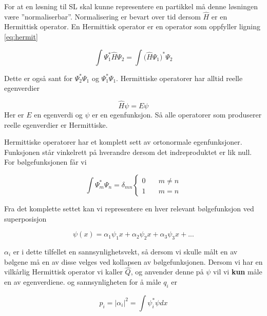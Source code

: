 For at en løsning til SL skal kunne representere en partikkel må denne løsningen være ''normaliserbar''. Normalisering er bevart over tid dersom $\hat{H}$ er en Hermittisk operator. En Hermittisk operator er en operator som oppfyller ligning \ref{eq:hermit}

\begin{equation}
    \label{eq:hermit}
    \int \Psi_1^*\hat{H}\Psi_2 = \int \bigl(\hat{H}\Psi_1\bigl)^*\Psi_2
\end{equation}

Dette er også sant for $\Psi_2^*\Psi_1$ og $\Psi_1^*\Psi_1$. Hermittiske operatorer har alltid reelle egenverdier

\begin{equation}
    \hat{H}\psi = E\psi
\end{equation}
Her er $E$ en egenverdi og $\psi$ er en egenfunksjon. Så alle operatorer som produserer reelle egenverdier er Hermittiske.

Hermittiske operatorer har et komplett sett av ortonormale egenfunksjoner. Funksjonen står vinkelrett på hverandre dersom det indreproduktet er lik null. For bølgefunksjonen får vi

\begin{equation}
\label{eq:hemittisk}
\int \Psi_m^*\Psi_n = \delta_{mn} \left\{
        \begin{array}{ll}
            0 & \quad m \neq n \\
            1 & \quad m = n 
        \end{array}
    \right.
\end{equation}

Fra det komplette settet kan vi representere en hver relevant bølgefunksjon ved superposisjon

\begin{equation}
    \label{eq:superpos}
    \psi(x) = \alpha_1\psi_1{x} + \alpha_2\psi_2{x} + \alpha_3\psi_3{x} + ...
\end{equation}

$\alpha_i$ er i dette tilfellet en sannsynlighetsvekt, så dersom vi skulle målt en av bølgene må en av disse velges ved kollapsen av bølgefunksjonen. Dersom vi har en vilkårlig Hermittisk operator vi kaller $\hat{Q}$, og anvender denne på $\psi$ vil vi \textbf{kun} måle en av egenverdiene. og sannsynligheten for å måle $q_i$ er

\begin{equation}
    p_i = |\alpha_i|^2 = \int \psi_i^*\psi dx
\end{equation}

